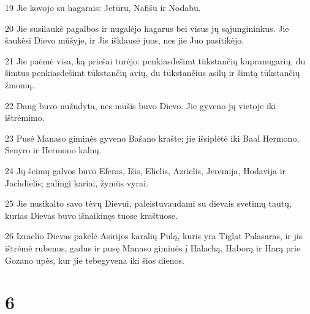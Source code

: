 \par 19 Jie kovojo su hagarais: Jetūru, Nafišu ir Nodabu. 
\par 20 Jie susilaukė pagalbos ir nugalėjo hagarus bei visus jų sąjungininkus. Jie šaukėsi Dievo mūšyje, ir Jis išklausė juos, nes jie Juo pasitikėjo. 
\par 21 Jie paėmė visa, ką priešai turėjo: penkiasdešimt tūkstančių kupranugarių, du šimtus penkiasdešimt tūkstančių avių, du tūkstančius asilų ir šimtą tūkstančių žmonių. 
\par 22 Daug buvo nužudyta, nes mūšis buvo Dievo. Jie gyveno jų vietoje iki ištrėmimo. 
\par 23 Pusė Manaso giminės gyveno Bašano krašte; jie išsiplėtė iki Baal Hermono, Senyro ir Hermono kalnų. 
\par 24 Jų šeimų galvos buvo Eferas, Išis, Elielis, Azrielis, Jeremija, Hodavija ir Jachdielis; galingi kariai, žymūs vyrai. 
\par 25 Jie nusikalto savo tėvų Dievui, paleistuvaudami su dievais svetimų tautų, kurias Dievas buvo išnaikinęs tuose kraštuose. 
\par 26 Izraelio Dievas pakėlė Asirijos karalių Pulą, kuris yra Tiglat Palasaras, ir jis ištrėmė rubenus, gadus ir pusę Manaso giminės į Halachą, Haborą ir Harą prie Gozano upės, kur jie tebegyvena iki šios dienos.



\chapter{6}


